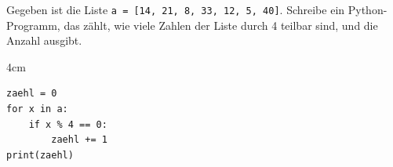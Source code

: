 \question[4]
Gegeben ist die Liste \texttt{a = [14, 21, 8, 33, 12, 5, 40]}. Schreibe ein Python-Programm, 
das zählt, wie viele Zahlen der Liste durch 4 teilbar sind, und die Anzahl ausgibt.

\begin{solutionbox}{4cm}
\begin{lstlisting}
zaehl = 0
for x in a:
    if x % 4 == 0:
        zaehl += 1
print(zaehl)
\end{lstlisting}
\end{solutionbox}